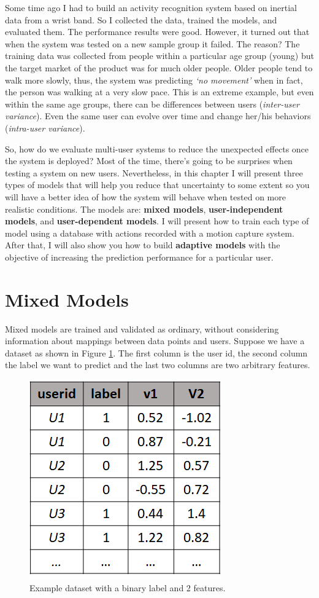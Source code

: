 \documentclass[
  11pt,
]{krantz}
\begin{document}
Some time ago I had to build an activity recognition system based on inertial data from a wrist band. So I collected the data, trained the models, and evaluated them. The performance results were good. However, it turned out that when the system was tested on a new sample group it failed. The reason? The training data was collected from people within a particular age group (young) but the target market of the product was for much older people. Older people tend to walk more slowly, thus, the system was predicting \emph{`no movement'} when in fact, the person was walking at a very slow pace. This is an extreme example, but even within the same age groups, there can be differences between users (\emph{inter-user variance}). Even the same user can evolve over time and change her/his behaviors (\emph{intra-user variance}).

So, how do we evaluate multi-user systems to reduce the unexpected effects once the system is deployed? Most of the time, there's going to be surprises when testing a system on new users. Nevertheless, in this chapter I will present three types of models that will help you reduce that uncertainty to some extent so you will have a better idea of how the system will behave when tested on more realistic conditions. The models are: \textbf{mixed models}, \textbf{user-independent models}, and \textbf{user-dependent models}. I will present how to train each type of model using a database with actions recorded with a motion capture system. After that, I will also show you how to build \textbf{adaptive models} with the objective of increasing the prediction performance for a particular user.

\hypertarget{mixed-models}{%
\section{Mixed Models}\label{mixed-models}}

Mixed models are trained and validated as ordinary, without considering information about mappings between data points and users. Suppose we have a dataset as shown in Figure \ref{fig:tblMixModel}. The first column is the user id, the second column the label we want to predict and the last two columns are two arbitrary features.

\begin{figure}

{\centering \includegraphics[width=0.3\linewidth]{images/table_mix_model} 

}

\caption{Example dataset with a binary label and 2 features.}\label{fig:tblMixModel}
\end{figure}
\end{document}
